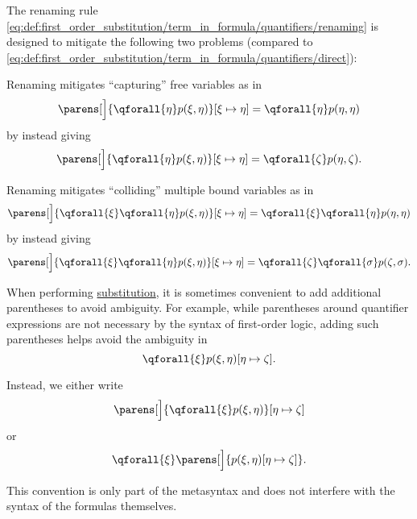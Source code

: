 \begin{remark}\label{rem:first_order_substitution_renaming_justification}
  The renaming rule \eqref{eq:def:first_order_substitution/term_in_formula/quantifiers/renaming} is designed to mitigate the following two problems (compared to \eqref{eq:def:first_order_substitution/term_in_formula/quantifiers/direct}):

  \begin{remenum}
     Renaming mitigates \enquote{capturing} free variables as in
    \begin{equation*}
      \parens[\Big]{ \qforall{\eta} p(\xi, \eta) }[\xi \mapsto \eta] = \qforall{\eta} p(\eta, \eta)
    \end{equation*}
    by instead giving
    \begin{equation*}
      \parens[\Big]{ \qforall{\eta} p(\xi, \eta) }[\xi \mapsto \eta] = \qforall{\zeta} p(\eta, \zeta).
    \end{equation*}

     Renaming mitigates \enquote{colliding} multiple bound variables as in
    \begin{equation*}
      \parens[\Big]{ \qforall{\xi} \qforall{\eta} p(\xi, \eta) }[\xi \mapsto \eta] = \qforall{\xi} \qforall{\eta} p(\eta, \eta)
    \end{equation*}
    by instead giving
    \begin{equation*}
      \parens[\Big]{ \qforall{\xi} \qforall{\eta} p(\xi, \eta) }[\xi \mapsto \eta] = \qforall{\zeta} \qforall{\sigma} p(\zeta, \sigma).
    \end{equation*}
  \end{remenum}
\end{remark}

\begin{remark}\label{rem:first_order_substitution_parentheses}
  When performing \hyperref[def:propositional_substitution]{substitution}, it is sometimes convenient to add additional parentheses to avoid ambiguity. For example, while parentheses around quantifier expressions are not necessary by the syntax of first-order logic, adding such parentheses helps avoid the ambiguity in
  \begin{equation*}
    \qforall{\xi} p(\xi, \eta) [\eta \mapsto \zeta].
  \end{equation*}

  Instead, we either write
  \begin{equation*}
    \parens[\Big]{ \qforall{\xi} p(\xi, \eta) } [\eta \mapsto \zeta]
  \end{equation*}
  or
  \begin{equation*}
    \qforall{\xi} \parens[\Big]{ p(\xi, \eta)[\eta \mapsto \zeta] }.
  \end{equation*}

  This convention is only part of the metasyntax and does not interfere with the syntax of the formulas themselves.
\end{remark}

